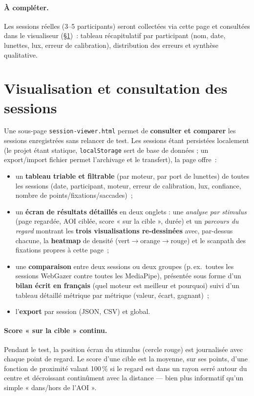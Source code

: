 \documentclass[11pt,a4paper]{article}
\newcommand{\code}[1]{\texttt{\small #1}}
\begin{document}
\paragraph{À compléter.} Les sessions réelles (3--5 participants) seront collectées
via cette page et consultées dans le visualiseur (§\ref{sec:viewer})~: tableau
récapitulatif par participant (nom, date, lunettes, lux, erreur de calibration),
distribution des erreurs et synthèse qualitative.

\section{Visualisation et consultation des sessions}
\label{sec:viewer}

Une sous-page \code{session-viewer.html} permet de \textbf{consulter et comparer}
les sessions enregistrées sans relancer de test. Les sessions étant persistées
localement (le projet étant statique, \code{localStorage} sert de base de données ;
un export/import fichier permet l'archivage et le transfert), la page offre~:
\begin{itemize}[leftmargin=1.4em]
  \item un \textbf{tableau triable et filtrable} (par moteur, par port de lunettes)
  de toutes les sessions (date, participant, moteur, erreur de calibration, lux,
  confiance, nombre de points/fixations/saccades)~;
  \item un \textbf{écran de résultats détaillés} en deux onglets : une \emph{analyse
  par stimulus} (page regardée, AOI ciblée, score « sur la cible », durée) et un
  \emph{parcours du regard} montrant les \textbf{trois visualisations re-dessinées}
  avec, par-dessus chacune, la \textbf{heatmap} de densité (vert$\to$orange$\to$rouge)
  et le scanpath des fixations propres à cette page~;
  \item une \textbf{comparaison} entre deux sessions ou deux groupes (p.\,ex.\ toutes
  les sessions WebGazer contre toutes les MediaPipe), présentée sous forme d'un
  \textbf{bilan écrit en français} (quel moteur est meilleur et pourquoi) suivi d'un
  tableau détaillé métrique par métrique (valeur, écart, gagnant)~;
  \item l'\textbf{export} par session (JSON, CSV) et global.
\end{itemize}

\paragraph{Score « sur la cible » continu.} Pendant le test, la position écran du
stimulus (cercle rouge) est journalisée avec chaque point de regard. Le score d'une
cible est la moyenne, sur ses points, d'une fonction de proximité valant 100\,\% si
le regard est dans un rayon serré autour du centre et décroissant continûment avec
la distance — bien plus informatif qu'un simple « dans/hors de l'AOI ».
\end{document}
